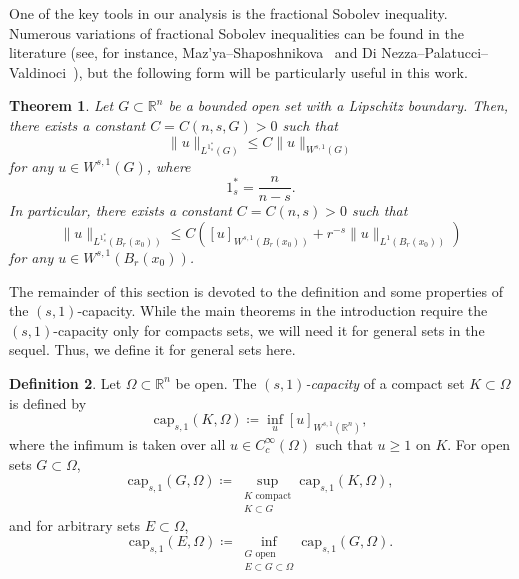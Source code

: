 \documentclass{amsart}
\theoremstyle{plain}
\newtheorem{theorem}{Theorem}[section]
\theoremstyle{definition}
\newtheorem{definition}[theorem]{Definition}
\numberwithin{equation}{section}
\begin{document}
One of the key tools in our analysis is the fractional Sobolev inequality. Numerous variations of fractional Sobolev inequalities can be found in the literature (see, for instance, Maz'ya--Shaposhnikova~\cite[Theorem~1]{MS02} and Di Nezza--Palatucci--Valdinoci~\cite[Theorem~6.7]{DNPV12}), but the following form will be particularly useful in this work.

\begin{theorem}\label{thm-FSI}
Let $G \subset \mathbb{R}^n$ be a bounded open set with a Lipschitz boundary. Then, there exists a constant $C=C(n, s, G)>0$ such that
\begin{equation*}
\|u\|_{L^{1^{\ast}_s}(G)} \leq C \|u\|_{W^{s, 1}(G)}
\end{equation*}
for any $u \in W^{s, 1}(G)$, where
\begin{equation}\label{eq-1-ast}
1^{\ast}_s=\frac{n}{n-s}.
\end{equation}
In particular, there exists a constant $C=C(n, s)>0$ such that
\begin{equation*}
\|u\|_{L^{1^{\ast}_s}(B_r(x_0))} \leq C \left( [u]_{W^{s, 1}(B_r(x_0))} + r^{-s} \|u\|_{L^1(B_r(x_0))} \right)
\end{equation*}
for any $u \in W^{s, 1}(B_r(x_0))$.
\end{theorem}

The remainder of this section is devoted to the definition and some properties of the $(s, 1)$-capacity. While the main theorems in the introduction require the $(s, 1)$-capacity only for compacts sets, we will need it for general sets in the sequel. Thus, we define it for general sets here.

\begin{definition}\label{def-cap}
Let $\Omega \subset \mathbb{R}^n$ be open. The \emph{$(s, 1)$-capacity} of a compact set $K \subset \Omega$ is defined by
\begin{equation*}
\mathrm{cap}_{s, 1}(K, \Omega) \coloneqq \inf_{u} {[u]_{W^{s, 1}(\mathbb{R}^n)}},
\end{equation*}
where the infimum is taken over all $u \in C^\infty_c(\Omega)$ such that $u \geq 1$ on $K$. For open sets $G \subset \Omega$,
\begin{equation*}
\mathrm{cap}_{s, 1}(G,\Omega) \coloneqq \sup_{\substack{K \text{ compact}\\ K \subset G}} \mathrm{cap}_{s, 1}(K,\Omega),
\end{equation*}
and for arbitrary sets $E \subset \Omega$,
\begin{equation*}
\mathrm{cap}_{s, 1}(E,\Omega) \coloneqq \inf_{\substack{G \text{ open}\\ E \subset G \subset \Omega}} \mathrm{cap}_{s, 1}(G,\Omega).
\end{equation*}
\end{definition}
\end{document}
